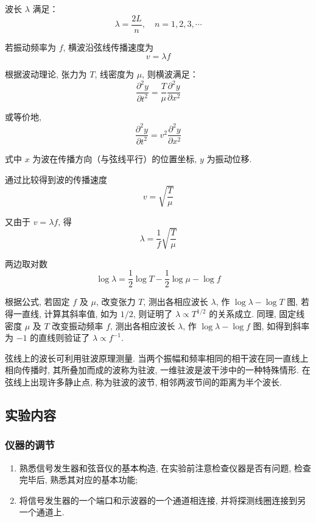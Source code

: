 \documentclass[zihao=5, UTF8]{article}
\theoremstyle{MyLineTheoremStyle} %
\theoremstyle{MyBlockTheoremStyle} %
\theoremstyle{MySubsubsectionStyle} %
\begin{document}
波长 $\lambda$ 满足：
\begin{equation}
\lambda = \frac{2L}{n}, \quad n = 1,2,3,\cdots
\end{equation}

若振动频率为 $f$, 横波沿弦线传播速度为
\begin{equation}
v = \lambda f
\end{equation}

根据波动理论, 张力为 $T$, 线密度为 $\mu$, 则横波满足：
\begin{equation}
\frac{\partial^{2}y}{\partial t^{2}} = \frac{T}{\mu}\frac{\partial^{2}y}{\partial x^{2}}
\end{equation}

或等价地, 
\begin{equation}
\frac{\partial^{2}y}{\partial t^{2}} = v^{2}\frac{\partial^{2}y}{\partial x^{2}}
\end{equation}

式中 $x$ 为波在传播方向（与弦线平行）的位置坐标, $y$ 为振动位移. 

通过比较得到波的传播速度
\begin{equation}
v = \sqrt{\frac{T}{\mu}}
\end{equation}

又由于 $v = \lambda f$, 得
\begin{equation}
\lambda = \frac{1}{f}\sqrt{\frac{T}{\mu}}
\end{equation}

两边取对数
\begin{equation}
\log\lambda = \frac{1}{2}\log T - \frac{1}{2}\log\mu - \log f
\end{equation}

根据公式, 若固定 $f$ 及 $\mu$, 改变张力 $T$, 测出各相应波长 $\lambda$, 作 $\log \lambda - \log T$ 图, 若得一直线, 计算其斜率值, 如为 $1/2$, 则证明了 $\lambda \propto {T}^{1/2}$ 的关系成立. 同理, 固定线密度 $\mu$ 及 $T$ 改变振动频率 $f$, 测出各相应波长 $\lambda$, 作 $\log \lambda - \log f$ 图, 如得到斜率为 $-1$ 的直线则验证了 $\lambda \propto {f}^{-1}$. 

弦线上的波长可利用驻波原理测量. 当两个振幅和频率相同的相干波在同一直线上相向传播时, 其所叠加而成的波称为驻波, 一维驻波是波干涉中的一种特殊情形. 在弦线上出现许多静止点, 称为驻波的波节, 相邻两波节间的距离为半个波长. 
\subsection{实验内容}
\subsubsection{仪器的调节}
\begin{enumerate}
    \item 熟悉信号发生器和弦音仪的基本构造, 在实验前注意检查仪器是否有问题, 检查完毕后, 熟悉其对应的基本功能;
    \item 将信号发生器的一个端口和示波器的一个通道相连接, 并将探测线圈连接到另一个通道上. 
\end{enumerate}
\end{document}

